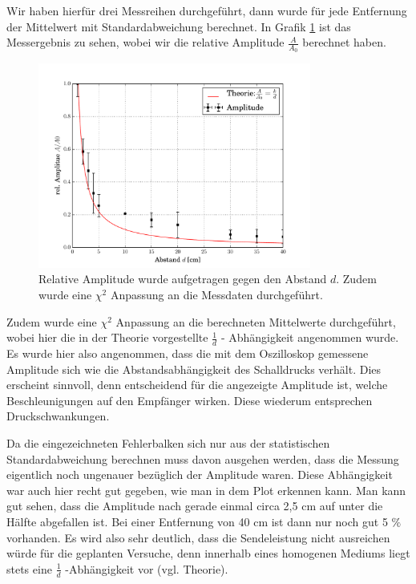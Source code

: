 \documentclass[12pt,a4paper,titlepage,headinclude,bibtotoc]{scrartcl}
\numberwithin{equation}{subsection}
\begin{document}
Wir haben hierfür drei Messreihen durchgeführt, dann wurde für jede Entfernung der Mittelwert mit Standardabweichung berechnet. In Grafik \ref{fig:schall} ist das Messergebnis zu sehen, wobei wir die relative Amplitude $\frac{A}{A_0}$ berechnet haben.

\begin{figure}[h]
	\centering
	\includegraphics[width=0.8\textwidth]{schall.pdf}
	\caption{Relative Amplitude wurde aufgetragen gegen den Abstand $d$. Zudem wurde eine $\chi^2$ Anpassung an die Messdaten durchgeführt.}
	\label{fig:schall}
\end{figure}

Zudem wurde eine $\chi^2$ Anpassung an die berechneten Mittelwerte durchgeführt, wobei hier die in der Theorie vorgestellte $\frac{1}{d}$ - Abhängigkeit angenommen wurde.
Es wurde hier also angenommen, dass die mit dem Oszilloskop gemessene Amplitude sich wie die Abstandsabhängigkeit des Schalldrucks verhält.
Dies erscheint sinnvoll, denn entscheidend für die angezeigte Amplitude ist, welche Beschleunigungen auf den Empfänger wirken.
Diese wiederum entsprechen Druckschwankungen.


Da die eingezeichneten Fehlerbalken sich nur aus der statistischen Standardabweichung berechnen muss davon ausgehen werden, dass die Messung eigentlich noch ungenauer bezüglich der Amplitude waren. Diese Abhängigkeit war auch hier recht gut gegeben, wie man in dem Plot erkennen kann. 
Man kann gut sehen, dass die Amplitude nach gerade einmal circa 2,5 cm auf unter die Hälfte abgefallen ist. Bei einer Entfernung von 40 cm ist dann nur noch gut 5 $\%$ vorhanden. Es wird also sehr deutlich, dass die Sendeleistung nicht ausreichen würde für die geplanten Versuche, denn innerhalb eines homogenen Mediums liegt stets eine $\frac{1}{d}$ -Abhängigkeit vor (vgl. Theorie). 
\end{document}
